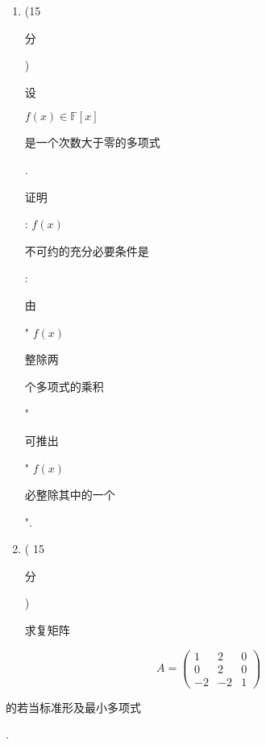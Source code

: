 \documentclass[10pt]{article}
\begin{document}
\begin{enumerate}
  \item (15 \begin{CJK}{UTF8}{mj}分\end{CJK}) \begin{CJK}{UTF8}{mj}设\end{CJK} $f(x) \in \mathbb{F}[x]$ \begin{CJK}{UTF8}{mj}是一个次数大于零的多项式\end{CJK}. \begin{CJK}{UTF8}{mj}证明\end{CJK}: $f(x)$ \begin{CJK}{UTF8}{mj}不可约的充分必要条件是\end{CJK}: \begin{CJK}{UTF8}{mj}由\end{CJK} " $f(x)$ \begin{CJK}{UTF8}{mj}整除两\end{CJK} \begin{CJK}{UTF8}{mj}个多项式的乘积\end{CJK}" \begin{CJK}{UTF8}{mj}可推出\end{CJK} " $f(x)$ \begin{CJK}{UTF8}{mj}必整除其中的一个\end{CJK}".

  \item ( 15 \begin{CJK}{UTF8}{mj}分\end{CJK}) \begin{CJK}{UTF8}{mj}求复矩阵\end{CJK}

\end{enumerate}
$$
A=\left(\begin{array}{ccc}
1 & 2 & 0 \\
0 & 2 & 0 \\
-2 & -2 & 1
\end{array}\right)
$$
\begin{CJK}{UTF8}{mj}的若当标准形及最小多项式\end{CJK}.
\end{document}
